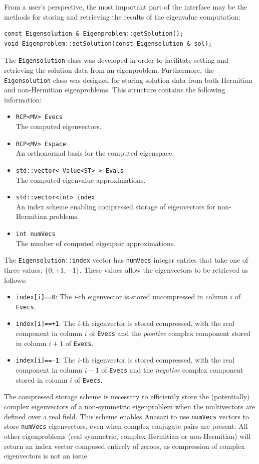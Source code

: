 \documentclass[acmtoms,acmnow]{acmtrans2m}
\newcommand{\aspace}[1]{\texttt{#1}}
\begin{document}
From a user's perspective, the most important part of the interface may be the methods 
for storing and retrieving the results of the eigenvalue computation:
\begin{verbatim}
const Eigensolution & Eigenproblem::getSolution();
void Eigenproblem::setSolution(const Eigensolution & sol);
\end{verbatim}
The \aspace{Eigensolution} class was developed in order to
facilitate setting and retrieving the solution data from an eigenproblem.  
Furthermore, the \aspace{Eigensolution} class was designed for storing
solution data from both Hermitian and non-Hermitian eigenproblems. 
This structure contains the following information:
\begin{itemize}
  \item \verb!RCP<MV> Evecs! \\
   The computed eigenvectors.
 \item \verb!RCP<MV> Espace! \\
   An orthonormal basis for the computed eigenspace.
 \item \verb!std::vector< Value<ST> > Evals! \\
   The computed eigenvalue approximations.
 \item \verb!std::vector<int> index! \\
   An index scheme enabling compressed storage of eigenvectors for non-Hermitian problems.
 \item \verb!int numVecs! \\
   The number of computed eigenpair approximations.
\end{itemize}
The \aspace{Eigensolution::index} vector has \aspace{numVecs} integer entries that take 
one of three values: $\{0, +1, -1\}$. These values allow the eigenvectors to be retrieved as follows:
\begin{itemize}
  \item \aspace{index[i]==0}: The $i$-th eigenvector is stored uncompressed in column $i$ of
    \verb!Evecs!.
  \item \aspace{index[i]==+1}: The $i$-th eigenvector is stored compressed, with the real
    component in column $i$ of \verb!Evecs! and the \emph{positive} complex component
    stored in column $i+1$ of \verb!Evecs!.
  \item \aspace{index[i]==-1}: The $i$-th eigenvector is stored compressed, with the real
    component in column $i-1$ of \verb!Evecs! and the \emph{negative} complex component
    stored in column $i$ of \verb!Evecs!.
\end{itemize}
The compressed storage scheme is necessary to efficiently store the (potentially) complex
eigenvectors of a non-symmetric eigenproblem when the multivectors are defined over a real
field. This scheme enables Anasazi to use \aspace{numVecs} vectors to store
\aspace{numVecs} eigenvectors, even when complex conjugate pairs are present. All other
eigenproblems (real symmetric, complex Hermitian or non-Hermitian) will return an index
vector composed entirely of zeroes, as compression of complex eigenvectors is not an
issue.
\end{document}
